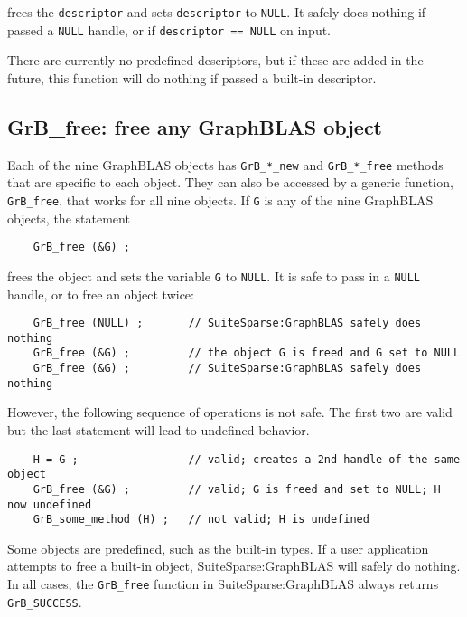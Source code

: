 \documentclass[12pt]{article}
\begin{document}
\noindent
frees the \verb'descriptor' and sets \verb'descriptor' to \verb'NULL'.  It
safely does nothing if passed a \verb'NULL' handle, or if
\verb'descriptor == NULL' on input.

There are currently no predefined descriptors, but if these are added in the
future, this function will do nothing if passed a built-in descriptor.

\subsection{{\sf GrB\_free:} free any GraphBLAS object} %
\label{free}

Each of the nine GraphBLAS objects has \verb'GrB_*_new' and \verb'GrB_*_free'
methods that are specific to each object.  They can also be accessed by a
generic function, \verb'GrB_free', that works for all nine objects.  If
\verb'G' is any of the nine GraphBLAS objects, the statement

    {\footnotesize
    \begin{verbatim}
    GrB_free (&G) ; \end{verbatim} }

\noindent
frees the object and sets the variable \verb'G' to \verb'NULL'.  It is safe to
pass in a \verb'NULL' handle, or to free an object twice:

    {\footnotesize
    \begin{verbatim}
    GrB_free (NULL) ;       // SuiteSparse:GraphBLAS safely does nothing
    GrB_free (&G) ;         // the object G is freed and G set to NULL
    GrB_free (&G) ;         // SuiteSparse:GraphBLAS safely does nothing \end{verbatim} }

\noindent
However, the following sequence of operations is not safe.  The first two are
valid but the last statement will lead to undefined behavior.

    {\footnotesize
    \begin{verbatim}
    H = G ;                 // valid; creates a 2nd handle of the same object
    GrB_free (&G) ;         // valid; G is freed and set to NULL; H now undefined
    GrB_some_method (H) ;   // not valid; H is undefined \end{verbatim}}

Some objects are predefined, such as the built-in types.  If a user application
attempts to free a built-in object, SuiteSparse:GraphBLAS will safely do
nothing.  In all cases, the \verb'GrB_free' function in SuiteSparse:GraphBLAS
always returns \verb'GrB_SUCCESS'.
\end{document}

